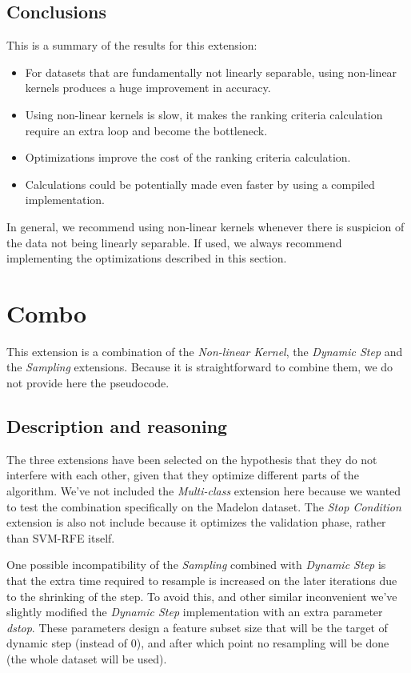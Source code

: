 \subsection{Conclusions}

This is a summary of the results for this extension:

\begin{itemize}
    \item For datasets that are fundamentally not linearly separable, using non-linear kernels produces a huge improvement in accuracy.
    \item Using non-linear kernels is slow, it makes the ranking criteria calculation re\-quire an extra loop and become the bottleneck.
    \item Optimizations improve the cost of the ranking criteria calculation.
    \item Calculations could be potentially made even faster by using a compiled im\-ple\-men\-ta\-tion. 
\end{itemize}

In general, we recommend using non-linear kernels whenever there is suspicion of the data not being linearly separable. If used, we always recommend im\-ple\-ment\-ing the optimizations described in this section.

\section{Combo}

This extension is a combination of the \emph{Non-linear Kernel}, the \emph{Dynamic Step} and the \emph{Sampling} extensions. Because it is straightforward to combine them, we do not provide here the pseudocode.

\subsection{Description and reasoning}

The three extensions have been selected on the hypothesis that they do not interfere with each other, given that they optimize different parts of the algorithm. We've not included the \emph{Multi-class} extension here because we wanted to test the combination specifically on the Madelon dataset. The \emph{Stop Condition} extension is also not include because it optimizes the validation phase, rather than SVM-RFE itself.

One possible incompatibility of the \emph{Sampling} combined with \emph{Dynamic Step} is that the extra time required to resample is increased on the later iterations due to the shrinking of the step. To avoid this, and other similar inconvenient we've slightly modified the \emph{Dynamic Step} implementation with an extra parameter \emph{dstop}. These parameters design a feature subset size that will be the target of dynamic step (instead of 0), and after which point no resampling will be done (the whole dataset will be used).

